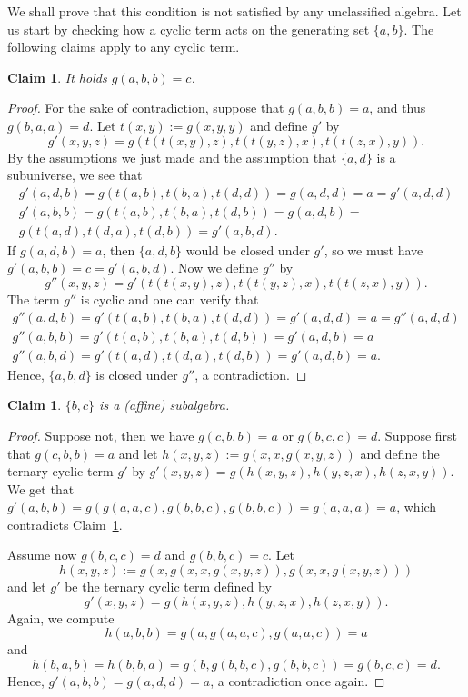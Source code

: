 \documentclass[11pt]{amsart}
\theoremstyle{definition}
\theoremstyle{remark}
\theoremstyle{plain}
\newtheorem{claim}[thm]{Claim}
\begin{document}
\begin{enumerate}[wide, labelindent=0pt]
\begin{enumerate}[wide, labelindent=0pt]
    We shall prove that this condition is not satisfied by any unclassified algebra. Let us start by checking how a cyclic term acts on the generating set $\{a,b\}$. The following claims apply to any cyclic term.
    \begin{claim}\label{c(abb)=d claim}
    It holds $g(a,b,b)=c$.
    \end{claim}
    \begin{proof}
    For the sake of contradiction, suppose that $g(a,b,b)=a$, and thus $g(b,a,a)=d$. Let $t(x,y):=g(x,y,y)$ and define $g'$ by $$g'(x,y,z)=g(t(t(x,y),z),t(t(y,z),x),t(t(z,x),y)).$$ By the assumptions we just made and the assumption that $\{a,d\}$ is a subuniverse, we see that 
    \[
    \begin{gathered}
    g'(a,d,b)=g(t(a,b),t(b,a),t(d,d))=g(a,d,d)=a=g'(a,d,d)\\
    g'(a,b,b)=g(t(a,b),t(b,a),t(d,b))=g(a,d,b)=\\
    g(t(a,d),t(d,a),t(d,b))=g'(a,b,d).
    \end{gathered}
    \]
    If $g(a,d,b)=a$, then $\{a,d,b\}$ would be closed under $g'$, so we must have $g'(a,b,b)=c=g'(a,b,d)$. Now we define $g''$ by $$g''(x,y,z)=g'(t(t(x,y),z),t(t(y,z),x),t(t(z,x),y)).$$ The term $g''$ is cyclic and one can verify that
    \[
    \begin{gathered}
     g''(a,d,b)=g'(t(a,b),t(b,a),t(d,d))=g'(a,d,d)=a=g''(a,d,d)\\    g''(a,b,b)=g'(t(a,b),t(b,a),t(d,b))=g'(a,d,b)=a\\
     g''(a,b,d)=g'(t(a,d),t(d,a),t(d,b))=g'(a,d,b)=a.    
    \end{gathered}
    \]
    Hence, $\{a,b,d\}$ is closed under $g''$, a contradiction.
    \end{proof}

    \begin{claim}\label{bdaffineclaim}
    $\{b,c\}$ is a (affine) subalgebra.
    \end{claim}
    \begin{proof}
    Suppose not, then we have $g(c,b,b)=a$ or $g(b,c,c)=d$. Suppose first that $g(c,b,b)=a$ and let $h(x,y,z):=g(x,x,g(x,y,z))$ and define the ternary cyclic term $g'$ by $g'(x,y,z)=g(h(x,y,z),h(y,z,x),h(z,x,y))$. We get that $g'(a,b,b)=g(g(a,a,c),g(b,b,c),g(b,b,c))=g(a,a,a)=a$, which contradicts Claim~\ref{c(abb)=d claim}. 

    Assume now $g(b,c,c)=d$ and $g(b,b,c)=c$. Let $$h(x,y,z):=g(x,g(x,x,g(x,y,z)),g(x,x,g(x,y,z)))$$ and let $g'$ be the ternary cyclic term defined by $$g'(x,y,z)=g(h(x,y,z),h(y,z,x),h(z,x,y)).$$ Again, we compute $$h(a,b,b)=g(a,g(a,a,c),g(a,a,c))=a$$ and $$h(b,a,b)=h(b,b,a)=g(b,g(b,b,c),g(b,b,c))=g(b,c,c)=d.$$ Hence, $g'(a,b,b)=g(a,d,d)=a$, a contradiction once again.
    \end{proof}


\end{enumerate}
\end{enumerate}
\end{document}
